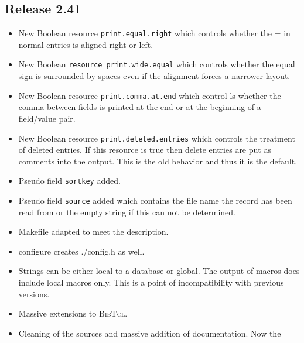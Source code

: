 \documentclass[11pt,a4paper]{scrartcl}
\newcommand\rsc[1]{\texttt{#1}}
\newcommand\File[1]{\textsf{#1}}
\newcommand\BibTcl{\textsc{BibTcl}}
\newenvironment{Release}[2]{%
  \def\tmp{#2}%
  \section*{Release #1 \ifx\tmp\empty\else{\normalsize[#2]}\fi}
  \begin{itemize}
}{\end{itemize}}
\newenvironment{Fix}[1]{\item }{}
\newenvironment{New}[1]{\item }{}
\newenvironment{Doc}[1]{\item }{}
\begin{document}
\begin{multicols}
 \begin{Release}{2.41}{}
  \begin{New}{gene}
    New Boolean resource \rsc{print.equal.right} which controls whether
    the = in normal entries is aligned right or left.
  \end{New}
  \begin{New}{gene}
    New Boolean \rsc{resource print.wide.equal} which controls whether
    the equal sign is surrounded by spaces even if the alignment forces a
    narrower layout.
  \end{New}
  \begin{New}{gene}
    New Boolean resource \rsc{print.comma.at.end} which control-ls
    whether the comma between fields is printed at the end or at the beginning
    of a field/value pair.
  \end{New}
  \begin{New}{gene}
    New Boolean resource \rsc{print.deleted.entries} which controls the
    treatment of deleted entries. If this resource is true then delete entries
    are put as comments into the output. This is the old behavior and thus it
    is the default.
  \end{New}
  \begin{New}{gene}
    Pseudo field \rsc{sortkey} added.
  \end{New}
  \begin{New}{gene}
    Pseudo field \rsc{source} added which contains the file name the
    record has been read from or the empty string if this can not be
    determined.
  \end{New}
  \begin{Fix}{gene}
    Makefile adapted to meet the description.
  \end{Fix}
  \begin{New}{gene}
	configure creates \File{./config.h} as well.
  \end{New}
  \begin{New}{gene}
    Strings can be either local to a database or global. The output of macros
    does include local macros only. This is a point of incompatibility with
    previous versions.
  \end{New}
  \begin{New}{gene}
    Massive extensions to \BibTcl.
  \end{New}
  \begin{Doc}{gene}
    Cleaning of the sources and massive addition of documentation. Now the

\end{Doc}
\end{Release}
\end{multicols}
\end{document}
